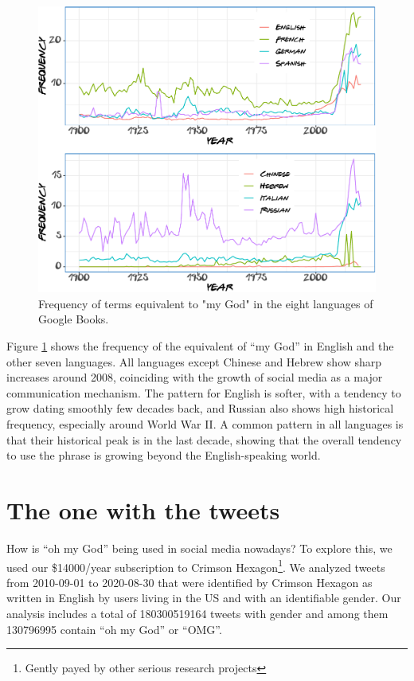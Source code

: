 \documentclass[]{article}
\begin{document}
\begin{figure}

{\centering \includegraphics{Friends_HPS_pdf_files/figure-latex/booksplots-1} 

}

\caption{Frequency of terms equivalent to "my God" in the eight languages of Google Books.}\label{fig:booksplots}
\end{figure}

Figure \ref{fig:booksplots} shows the frequency of the equivalent of ``my God'' in English and the other seven languages. All languages except Chinese and Hebrew show sharp increases around 2008, coinciding with the growth of social media as a major communication mechanism. The pattern for English is softer, with a tendency to grow dating smoothly few decades back, and Russian also shows high historical frequency, especially around World War II. A common pattern in all languages is that their historical peak is in the last decade, showing that the overall tendency to use the phrase is growing beyond the English-speaking world.

\hypertarget{the-one-with-the-tweets}{%
\section{The one with the tweets}\label{the-one-with-the-tweets}}

How is ``oh my God'' being used in social media nowadays? To explore this, we used our \$14000/year subscription to Crimson Hexagon\footnote{Gently payed by other serious research projects}. We analyzed tweets from
2010-09-01 to 2020-08-30 that were identified by Crimson Hexagon as written in English by users living in the US and with an identifiable gender. Our analysis includes a total of 180300519164 tweets with gender and among them 130796995 contain ``oh my God'' or ``OMG''.
\end{document}
